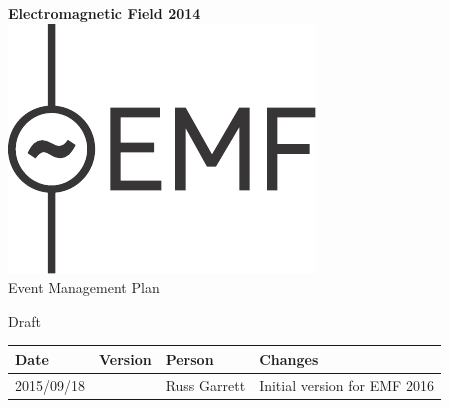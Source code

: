 

\newcommand{\st}{\superscript{st} }
\newcommand{\nd}{\superscript{nd} }
\renewcommand{\th}{\superscript{th} }




\begin{titlepage}
\thispagestyle{empty}
\begin{center}
{\bf \LARGE Electromagnetic Field 2014}\\[36pt]
\includegraphics{emf-logo.pdf}\\[48pt]
{\Large Event Management Plan}

Draft

\vfill

\begin{tabular}{l | l | l | p{10cm}}
  Date & Version & Person & Changes \\
  \hline
  2015/09/18 &  & Russ Garrett & Initial version for EMF 2016 \\
\end{tabular}

\end{center}
\end{titlepage}

\tableofcontents

\newpage



